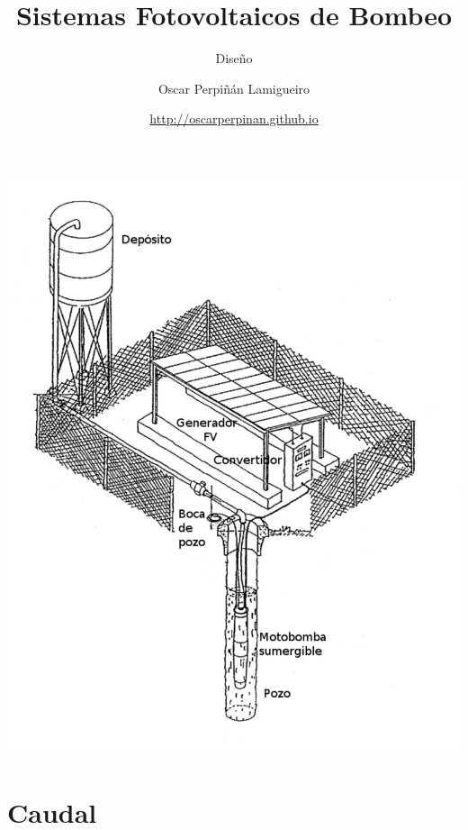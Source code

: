 \documentclass[xcolor={usenames,svgnames,dvipsnames}]{beamer}
\author{Oscar Perpiñán Lamigueiro}
\date{\url{http://oscarperpinan.github.io}}
\title{Sistemas Fotovoltaicos de Bombeo}
\subtitle{Diseño}
\begin{document}
\maketitle

\begin{frame}[label={sec:orged00caf}]{}
\begin{center}
\begin{center}
\includegraphics[height=0.9\textheight]{../figs/EsquemaBombeo_oscar.pdf}
\end{center}
\end{center}
\end{frame}


\section{Caudal}
\label{sec:orge253c9b}
\end{document}

